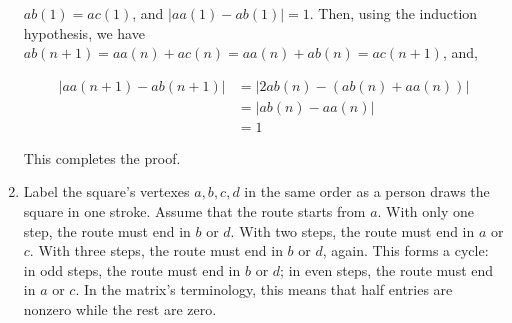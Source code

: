 \begin{exercise}{17}
\begin{enumerate}
          $ab(1) = ac(1)$, and $|aa(1) - ab(1)| = 1$. Then, using the induction hypothesis, we have $ab(n+1) = aa(n) + ac(n) = aa(n) + ab(n) = ac(n+1)$, and,
          
          \begin{align*}
            |aa(n+1) - ab(n+1)| &= |2ab(n) - (ab(n) + aa(n))| \\
                                &= |ab(n) - aa(n)| \\
                                &= 1
          \end{align*}
          
          This completes the proof. \QED
    
    \item Label the square's vertexes $a, b, c, d$ in the same order as a person draws the square in one stroke. Assume that the route starts from $a$. With only one step, the route must end in $b$ or $d$. With two steps, the route must end in $a$ or $c$. With three steps, the route must end in $b$ or $d$, again. This forms a cycle: in odd steps, the route must end in $b$ or $d$; in even steps, the route must end in $a$ or $c$. In the matrix's terminology, this means that half entries are nonzero while the rest are zero. \QED
  \end{enumerate}
\end{exercise}

